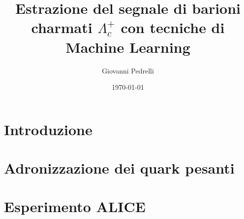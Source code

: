 \documentclass[a4paper,
               12pt,
               twoside,
               openright,
               onecolumn,
               final,
               titlepage]{book}
\title{Estrazione del segnale di barioni charmati $\Lambda^+_c$ con tecniche di Machine Learning}
\author{Giovanni Pedrelli}
\date{\today}
\begin{document}
    
    \pagestyle{fancy}

    
    \fncyfront  
    \frontmatter{}
        \pagestyle{empty}
        \begin{titlepage}
            
        \end{titlepage}
        
        \cleardoublepage %
        
            
        \begin{abstract}
            
        \end{abstract}
    \tableofcontents


    \fncymain
    \mainmatter{}
        \pagestyle{headings}
        \chapter*{Introduzione}
            
        \chapter{Adronizzazione dei quark pesanti}
        \label{cha:1-QCD}        
            
        \chapter{Esperimento ALICE}
        \label{cha:2-ALICE}
            
\end{document}

